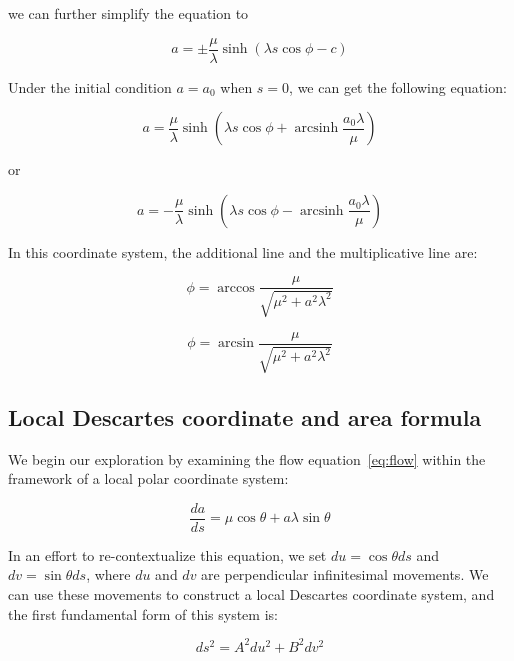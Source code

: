 \documentclass{article}
\numberwithin{definition}{section}
\numberwithin{lemma}{section}
\numberwithin{proposition}{section}
\numberwithin{corollary}{section}
\numberwithin{theorem}{section}
\DeclareMathOperator{\arcsinh}{arcsinh}
\begin{document}
we can further simplify the equation to

\begin{equation}
    a = \pm \frac{\mu}{\lambda} \sinh(\lambda s \cos \phi - c)\label{eq:gradevo}
\end{equation}

Under the initial condition $a = a_0$ when $s = 0$, we can get the following equation:

\begin{equation}
    a = \frac{\mu}{\lambda} \sinh(\lambda s \cos \phi + \arcsinh \frac{a_0 \lambda}{\mu})\label{eq:gradevo2}
\end{equation}

or

\begin{equation}
    a = - \frac{\mu}{\lambda} \sinh(\lambda s \cos \phi - \arcsinh \frac{a_0 \lambda}{\mu})\label{eq:gradevo3}
\end{equation}

In this coordinate system, the additional line and the multiplicative line are:

\begin{equation}
    \phi = \arccos \frac{\mu}{\sqrt {\mu^2 + a^2 \lambda^2}} \label{eq:additionalline}
\end{equation}

\begin{equation}
    \phi = \arcsin \frac{\mu}{\sqrt {\mu^2 + a^2 \lambda^2}}\label {eq:mulitiplcativeline}
\end{equation}

\subsection{Local Descartes coordinate and area formula}\label{subsec:descartes-coordinate}
We begin our exploration by examining the flow equation~\eqref{eq:flow} within the framework of a local polar coordinate system:

\begin{equation}
    \frac{da}{ds} = \mu \cos \theta + a \lambda \sin \theta
\end{equation}

In an effort to re-contextualize this equation, we set $du = \cos \theta ds$ and $dv = \sin \theta ds$,
where $du$ and $dv$ are perpendicular infinitesimal movements.
We can use these movements to construct a local Descartes coordinate system, and the first fundamental form of this system is:

\begin{equation}
    ds^2 = A^2 du^2 + B^2 dv^2
\end{equation}
\end{document}
